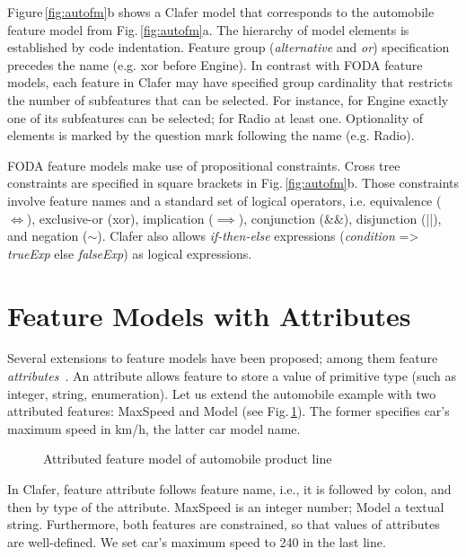 \documentclass{llncs}
\newcommand{\figref}[1]{Fig.\,\ref{fig:#1}}
\newcommand{\Figref}[1]{Figure\,\ref{fig:#1}}
\begin{document}
\Figref{autofm}b shows a Clafer model that corresponds to the automobile feature model from \figref{autofm}a. The hierarchy of model elements is established by code indentation. Feature group (\emph{alternative} and \emph{or}) specification precedes the name (e.g. \textsf{xor} before \textsf{Engine}). In contrast with FODA feature models, each feature in Clafer may have specified group cardinality that restricts the number of subfeatures that can be selected. For instance, for \textsf{Engine} exactly one of its subfeatures can be selected; for \textsf{Radio} at least one. Optionality of elements is marked by the question mark following the name (e.g. \textsf{Radio}).

FODA feature models make use of propositional constraints. Cross tree constraints are specified in square brackets in \figref{autofm}b. Those constraints involve feature names and a standard set of logical operators, i.e. equivalence ($\iff$), exclusive-or (\textsf{xor}), implication ($\implies$), conjunction (\textsf{\&\&}), disjunction (\textsf{||}), and negation (\textsf{$\sim$}). Clafer also allows \textit{if-then-else} expressions (\textit{condition} \textsf{=>} \textit{trueExp} \textsf{else} \textit{falseExp}) as logical expressions.

\section{Feature Models with Attributes}

Several extensions to feature models have been proposed; among them feature \emph{attributes}~\cite{benavides:fama:2005}. An attribute allows feature to store a value of primitive type (such as integer, string, enumeration). Let us extend the automobile example with two attributed features: \textsf{MaxSpeed} and \textsf{Model} (see \figref{aautofm}). The former specifies car's maximum speed in km/h, the latter car model name.

\begin{figure}
  
  \caption{Attributed feature model of automobile product line\label{fig:aautofm}}
\end{figure}

In Clafer, feature attribute follows feature name, i.e., it is followed by colon, and then by type of the attribute. \textsf{MaxSpeed} is an integer number;  \textsf{Model} a textual string. Furthermore, both features are constrained, so that values of attributes are well-defined. We set car's maximum speed to 240 in the last line.
\end{document}
